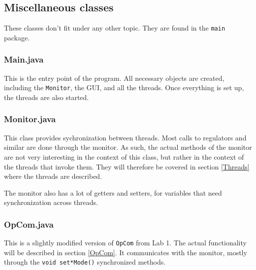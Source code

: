 


\subsection{Miscellaneous classes} 	%
These classes don't fit under any other topic. They are found in the \texttt{main} package.

\subsubsection{Main.java}
This is the entry point of the program. 
All necessary objects are created, including the \texttt{Monitor}, the GUI, and all the threads.  
Once everything is set up, the threads are also started. 

\subsubsection{Monitor.java}
This class provides sychronization between threads. Most calls to regulators and similar are done through the monitor. 
As such, the actual methods of the monitor are not very interesting in the context of this class, but rather in the context of the threads that invoke them. 
They will therefore be covered in section \ref{Threads} where the threads are described.

The monitor also has a lot of getters and setters, for variables that need synchronization across threads.

\subsubsection{OpCom.java}
This is a slightly modified version of \texttt{OpCom} from Lab 1. 
The actual functionality will be described in section \ref{OpCom}. 
It communicates with the monitor, mostly through the \texttt{void set*Mode()} synchronized methods.



